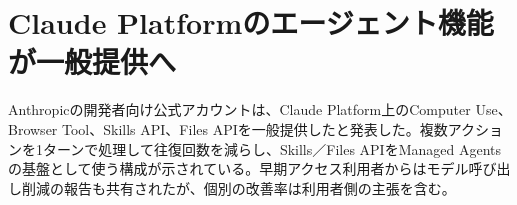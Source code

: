 \section{Claude Platformのエージェント機能が一般提供へ}
Anthropicの開発者向け公式アカウントは、Claude Platform上のComputer Use、Browser Tool、Skills API、Files APIを一般提供したと発表した。複数アクションを1ターンで処理して往復回数を減らし、Skills／Files APIをManaged Agentsの基盤として使う構成が示されている。早期アクセス利用者からはモデル呼び出し削減の報告も共有されたが、個別の改善率は利用者側の主張を含む。
